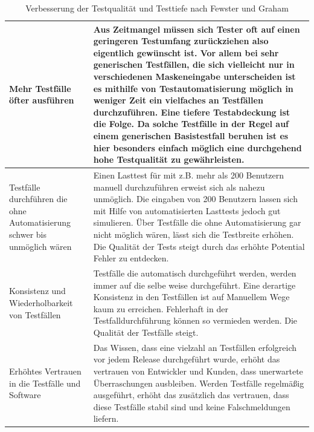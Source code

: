 \begin{table}
\begin{tabular}{p{}|p{}}
\\
\hline 
Mehr Testfälle öfter ausführen
& Aus Zeitmangel müssen sich Tester oft auf einen geringeren Testumfang zurückziehen also eigentlich gewünscht ist. Vor allem bei sehr generischen Testfällen, die sich vielleicht nur in verschiedenen Maskeneingabe unterscheiden ist es mithilfe von Testautomatisierung möglich in weniger Zeit ein vielfaches an Testfällen durchzuführen.
Eine tiefere Testabdeckung ist die Folge. Da solche Testfälle in der Regel auf einem generischen Basistestfall beruhen ist es hier besonders einfach möglich eine durchgehend hohe Testqualität zu gewährleisten. \\ 
\hline 
Testfälle durchführen die ohne Automatisierung schwer bis unmöglich wären & 
Einen Lasttest für mit z.B. mehr als 200 Benutzern manuell durchzuführen erweist sich als nahezu unmöglich. Die eingaben von 200 Benutzern lassen sich mit Hilfe von automatisierten Lasttests jedoch gut simulieren. Über Testfälle die ohne Automatisierung gar nicht möglich wären, lässt sich die Testbreite erhöhen. Die Qualität der Tests steigt durch das erhöhte Potential Fehler zu entdecken. \\ 
\hline 
Konsistenz und Wiederholbarkeit von Testfällen & Testfälle die automatisch durchgeführt werden, werden immer auf die selbe weise durchgeführt. Eine derartige Konsistenz in den Testfällen ist auf Manuellem Wege kaum zu erreichen. Fehlerhaft in der Testfalldurchführung können so vermieden werden. Die Qualität der Testfälle steigt. \\ 
\hline 
Erhöhtes Vertrauen in die Testfälle und Software & Das Wissen, dass eine vielzahl an Testfällen erfolgreich vor jedem Release durchgeführt wurde, erhöht das vertrauen von Entwickler und Kunden, dass unerwartete Überraschungen ausbleiben.
Werden Testfälle regelmäßig ausgeführt, erhöht das zusätzlich das vertrauen, dass diese Testfälle stabil sind und keine Falschmeldungen liefern. \\ 


\end{tabular} 
\caption{Verbesserung der Testqualität und Testtiefe nach Fewster und Graham \cite[vgl. S. 9 ff.]{fewster_software_1999}}
\label{tbl:qualitaet_testautomatisierung}
\end{table}

